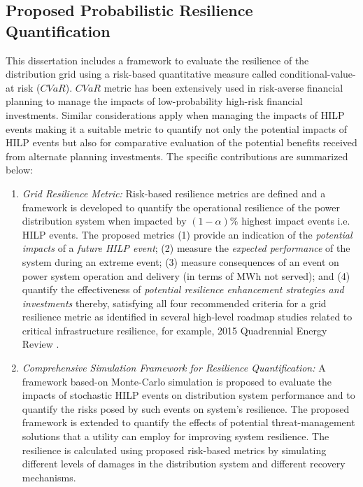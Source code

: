 \documentclass[12pt]{article}
\begin{document}
\subsection{Proposed Probabilistic Resilience Quantification}
This dissertation includes a framework to evaluate the resilience of the distribution grid using a risk-based quantitative measure called conditional-value-at risk ($CVaR$). $CVaR$ metric has been extensively used in risk-averse financial planning to manage the impacts of low-probability high-risk financial investments. Similar considerations apply when managing the impacts of HILP events making it a suitable metric to quantify not only the potential impacts of HILP events but also for comparative evaluation of the potential benefits received from alternate planning investments.
The specific contributions are summarized below:
\begin{enumerate}
    \item {\em Grid Resilience Metric:} Risk-based resilience metrics are defined and a framework is developed to quantify the operational resilience of the power distribution system when impacted by $(1-\alpha)\%$ highest impact events i.e. HILP events. The proposed metrics (1) provide an indication of the \textit{potential impacts} of a \textit{future HILP event}; (2) measure the \textit{expected performance} of the system during an extreme event; (3) measure consequences of an event on power system operation and delivery (in terms of MWh not served); and (4) quantify the effectiveness of \textit{potential resilience enhancement strategies and investments} thereby, satisfying all four recommended criteria for a grid resilience metric as identified in several high-level roadmap studies related to critical infrastructure resilience, for example, 2015 Quadrennial Energy Review \cite{watson2014conceptual}. 
    \item {\em Comprehensive Simulation Framework for Resilience Quantification:} A framework based-on Monte-Carlo simulation is proposed to evaluate the impacts of stochastic HILP events on distribution system performance and to quantify the risks posed by such events on system's resilience. The proposed framework is extended to quantify the effects of potential threat-management solutions that a utility can employ for improving system resilience. %
    The resilience is calculated using proposed risk-based metrics by simulating different levels of damages in the distribution system and different recovery mechanisms.
\end{enumerate}
\end{document}
